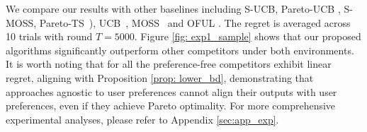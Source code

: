 We compare our results with other baselines including S-UCB, Pareto-UCB \cite{drugan2013designing}, S-MOSS, Pareto-TS~\cite{yahyaa2015thompson}), UCB~\cite{auer2002finite}, MOSS~\cite{audibert2009minimax} and OFUL \cite{abbasi2011improved}.
The regret is averaged across 10 trials with round $T = 5000$.
Figure \ref{fig: exp1_sample} shows that our proposed algorithms significantly outperform other competitors under both environments.
It is worth noting that for all the preference-free competitors exhibit linear regret, aligning with Proposition \ref{prop: lower_bd}, demonstrating that approaches agnostic to user preferences cannot align their outputs with user preferences, even if they achieve Pareto optimality.
For more comprehensive experimental analyses, please refer to Appendix \ref{sec:app_exp}.
